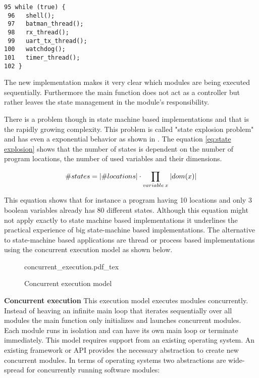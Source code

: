 \begin{lstlisting}[label=lst:urbaniak_main,caption=main function implementation]
 95 while (true) {
 96   shell();
 97   batman_thread();
 98   rx_thread();
 99   uart_tx_thread();
100   watchdog();
101   timer_thread();
102 }
\end{lstlisting}

The new implementation makes it very clear which modules are being executed sequentially. Furthermore the main function does not act as a controller but rather leaves the state management in the module's responsibility.

There is a problem though in state machine based implementations and that is the rapidly growing complexity. This problem is called "state explosion problem" and has even a exponential behavior as shown in \cite{katoen}. The equation \ref{eq:state explosion} shows that the number of states is dependent on the number of program locations, the number of used variables and their dimensions.

\begin{equation}
\label{eq:state explosion}
\#states = \lvert\#locations\rvert \cdot \prod_{variable \: x} \: \lvert dom(x)\rvert
\end{equation}

This equation shows that for instance a program having 10 locations and only 3 boolean variables already has 80 different states. Although this equation might not apply exactly to state machine based implementations it underlines the practical experience of big state-machine based implementations. The alternative to state-machine based applications are thread or process based implementations using the concurrent execution model as shown below.

\begin{figure}[H]
\centering
{concurrent_execution.pdf_tex}
\caption[]{Concurrent execution model}
\end{figure}

\textbf{Concurrent execution}
This execution model executes modules concurrently. Instead of heaving an infinite main loop that iterates sequentially over all modules the main function only initializes and launches concurrent modules. Each module runs in isolation and can have its own main loop or terminate immediately. This model requires support from an existing operating system. An existing framework or API provides the necessary abstraction to create new concurrent modules. In terms of operating systems two abstractions are wide-spread for concurrently running software modules:

